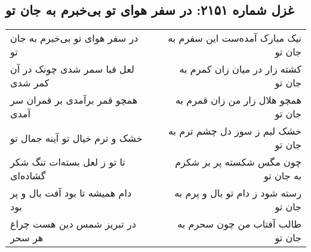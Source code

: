 \begin{center}
\section*{غزل شماره ۲۱۵۱: در سفر هوای تو بی‌خبرم به جان تو}
\label{sec:2151}
\begin{longtable}{l p{0.5cm} r}
در سفر هوای تو بی‌خبرم به جان تو
&&
نیک مبارک آمده‌ست این سفرم به جان تو
\\
لعل قبا سمر شدی چونک در آن کمر شدی
&&
کشته زار در میان زان کمرم به جان تو
\\
همچو قمر برآمدی بر قمران سر آمدی
&&
همچو هلال زار من زان قمرم به جان تو
\\
خشک و ترم خیال تو آینه جمال تو
&&
خشک لبم ز سوز دل چشم ترم به جان تو
\\
تا تو ز لعل بسته‌ات تنگ شکر گشاده‌ای
&&
چون مگس شکسته پر بر شکرم به جان تو
\\
دام همیشه تا بود آفت بال و پر بود
&&
رسته شود ز دام تو بال و پرم به جان تو
\\
در تبریز شمس دین هست چراغ هر سحر
&&
طالب آفتاب من چون سحرم به جان تو
\\
\end{longtable}
\end{center}
